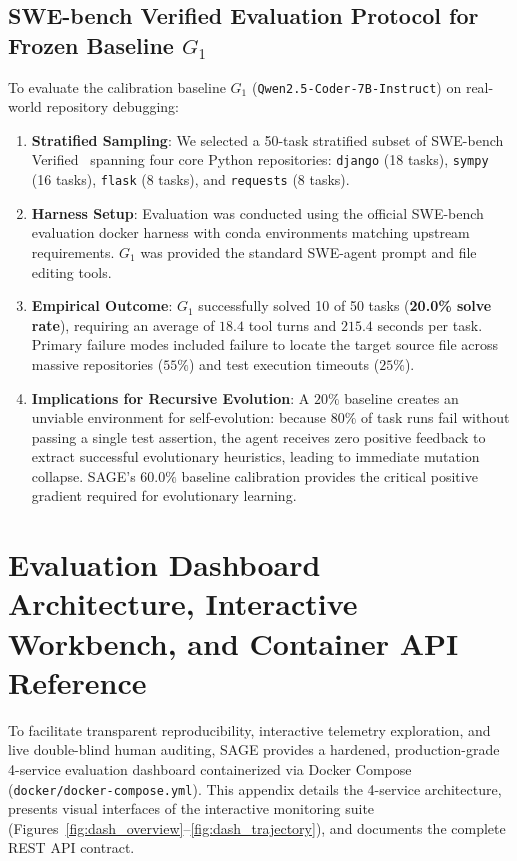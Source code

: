 \documentclass{article}
\begin{document}
\subsection{SWE-bench Verified Evaluation Protocol for Frozen Baseline $G_1$}
To evaluate the calibration baseline $G_1$ (\texttt{Qwen2.5-Coder-7B-Instruct}) on real-world repository debugging:
\begin{enumerate}
    \item \textbf{Stratified Sampling}: We selected a 50-task stratified subset of SWE-bench Verified~\cite{jimenez2024swebench} spanning four core Python repositories: \texttt{django} (18 tasks), \texttt{sympy} (16 tasks), \texttt{flask} (8 tasks), and \texttt{requests} (8 tasks).
    \item \textbf{Harness Setup}: Evaluation was conducted using the official SWE-bench evaluation docker harness with conda environments matching upstream requirements. $G_1$ was provided the standard SWE-agent prompt and file editing tools.
    \item \textbf{Empirical Outcome}: $G_1$ successfully solved 10 of 50 tasks (\textbf{20.0\% solve rate}), requiring an average of $18.4$ tool turns and $215.4$ seconds per task. Primary failure modes included failure to locate the target source file across massive repositories ($55\%$) and test execution timeouts ($25\%$).
    \item \textbf{Implications for Recursive Evolution}: A $20\%$ baseline creates an unviable environment for self-evolution: because $80\%$ of task runs fail without passing a single test assertion, the agent receives zero positive feedback to extract successful evolutionary heuristics, leading to immediate mutation collapse. SAGE's $60.0\%$ baseline calibration provides the critical positive gradient required for evolutionary learning.
\end{enumerate}

\section{Evaluation Dashboard Architecture, Interactive Workbench, and Container API Reference}
\label{app:dashboard_api}

To facilitate transparent reproducibility, interactive telemetry exploration, and live double-blind human auditing, SAGE provides a hardened, production-grade 4-service evaluation dashboard containerized via Docker Compose (\texttt{docker/docker-compose.yml}). This appendix details the 4-service architecture, presents visual interfaces of the interactive monitoring suite (Figures~\ref{fig:dash_overview}--\ref{fig:dash_trajectory}), and documents the complete REST API contract.
\end{document}
